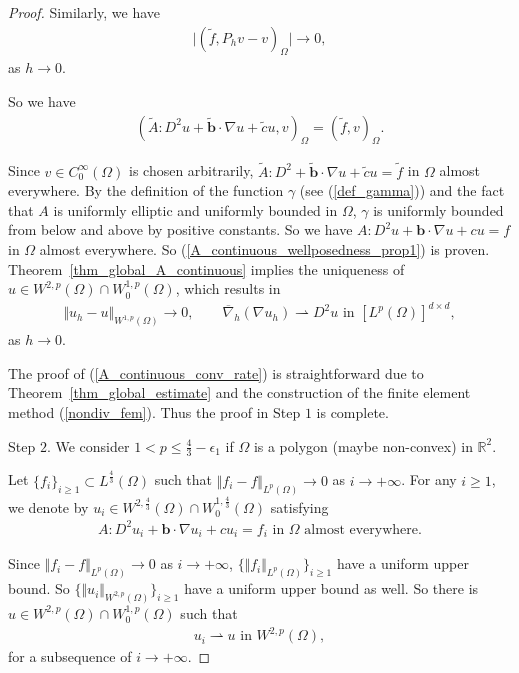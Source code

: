 \documentclass[10pt,a4paper]{amsart}
\begin{document}
\begin{proof}
Similarly, we have 
\begin{align*}
\vert (\tilde{f}, P_{h}v - v)_{\Omega} \vert \rightarrow 0,
\end{align*}
as $h \rightarrow 0$.

So we have 
\begin{align*}
(\tilde{A}:D^{2}u + \tilde{\boldsymbol{b}}\cdot\nabla u 
+ \tilde{c}u, v)_{\Omega} = (\tilde{f}, v)_{\Omega}. 
\end{align*}

Since $v \in C_{0}^{\infty}(\Omega)$ is chosen arbitrarily, 
$\tilde{A}:D^{2}+\tilde{\boldsymbol{b}}\cdot\nabla u 
+ \tilde{c}u = \tilde{f}$ in $\Omega$ almost everywhere. 
By the definition of the function $\gamma$ (see (\ref{def_gamma})) and 
the fact that $A$ is uniformly elliptic and uniformly bounded in $\Omega$,  
$\gamma$ is uniformly bounded from below and above by positive constants. 
So we have $A:D^{2}u +\boldsymbol{b}\cdot\nabla u + cu = f$ in $\Omega$ 
almost everywhere. 
So (\ref{A_continuous_wellposedness_prop1}) 
is proven. Theorem~\ref{thm_global_A_continuous} implies the uniqueness of 
$u \in W^{2,p}(\Omega) \cap W_{0}^{1,p}(\Omega)$, which results in 
\begin{align*}
\Vert u_{h} - u\Vert_{W^{1,p}(\Omega)} \rightarrow 0, \qquad 
\overline{\nabla}_{h}(\nabla u_{h}) \rightharpoonup D^{2}u 
\text{ in } [L^{p}(\Omega)]^{d \times d},
\end{align*}
as $h \rightarrow 0$. 

The proof of (\ref{A_continuous_conv_rate}) is straightforward due to 
Theorem~\ref{thm_global_estimate} and the construction of the finite element method (\ref{nondiv_fem}).
Thus the proof in Step $1$ is complete.

Step $2$. We consider $1< p \leq \frac{4}{3} - \epsilon_{1}$ if $\Omega$ is a 
polygon (maybe non-convex) in $\mathbb{R}^{2}$. 

Let $\{{f_{i}}\}_{i \geq 1} \subset L^{\frac{4}{3}}(\Omega)$ such that 
$\Vert f_{i} -f \Vert_{L^{p}(\Omega)} \rightarrow 0$ as $i \rightarrow +\infty$. 
For any $i \geq 1$, we denote by $u_{i} \in W^{2,\frac{4}{3}}(\Omega) \cap 
W_{0}^{1, \frac{4}{3}}(\Omega)$ satisfying 
\begin{align*}
A:D^{2} u_{i} + \boldsymbol{b}\cdot \nabla u_{i} + c u_{i} = f_{i} 
\text{ in } \Omega \text{ almost everywhere}.
\end{align*}

Since $\Vert f_{i} -f \Vert_{L^{p}(\Omega)} \rightarrow 0$ as $i \rightarrow +\infty$, 
$\{ \Vert f_{i} \Vert_{L^{p}(\Omega)} \}_{i \geq 1}$ have a uniform upper bound. 
So $\{ \Vert u_{i}\Vert_{W^{2,p}(\Omega)} \}_{i \geq 1}$ have a uniform upper bound 
as well. So there is $u \in W^{2,p}(\Omega) \cap W_{0}^{1,p}(\Omega)$ such that 
\begin{align*}
u_{i} \rightharpoonup u \text{ in } W^{2,p}(\Omega),
\end{align*}
for a subsequence of $i \rightarrow + \infty$.


\end{proof}
\end{document}
